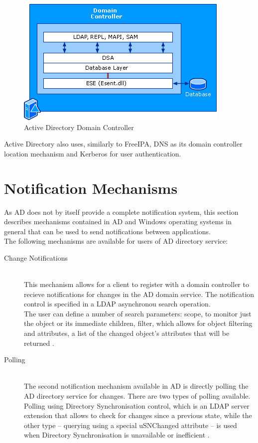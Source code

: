 \begin{figure}[!ht]
    \centering
        \includegraphics[scale=0.6]{fig/AD-controller}
    \caption{Active Directory Domain Controller \cite{ADoverview}}
    \label{fig:adController}
\end{figure}

Active Directory also uses, similarly to FreeIPA, DNS as its domain controller location mechanism and Kerberos for user authentication.

\FloatBarrier
\section{Notification Mechanisms}
\label{sec:adNotif}
As AD does not by itself provide a complete notification system, this section describes mechanisms contained in AD and Windows operating systems in general that can be used to send notifications between applications. \\
The following mechanisms are available for users of AD directory service:

\begin{description}
    \item[Change Notifications]\hfill \\
        This mechanism allows for a client to register with a domain controller to recieve notifications for changes in the AD domain service. The notification control is specified in a LDAP asynchronou search
        operation. \\
        The user can define a number of search parameters: scope, to monitor just the object or its immediate children, filter, which allows for object filtering and
        attributes, a list of the changed object's attributes that will be returned \cite{ADtrack}.
    \item[Polling]\hfill \\
        The second notification mechanism available in AD is directly polling the AD directory service for changes.
        There are two types of polling available. Polling using Directory Synchronisation control, which is an LDAP server extension that allows to check for changes since a previous state,
        while the other type -- querying using a special uSNChanged attribute -- is used when Directory Synchronisation is unavailable or inefficient \cite{ADtrack}.
\end{description}

